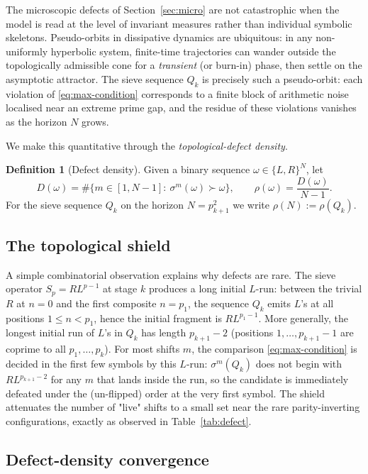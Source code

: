 \documentclass{iopjournal}
\theoremstyle{definition}
\newtheorem{definition}{Definition}
\begin{document}
The microscopic defects of Section~\ref{sec:micro} are not catastrophic
when the model is read at the level of invariant measures rather than
individual symbolic skeletons. Pseudo-orbits in dissipative dynamics are
ubiquitous: in any non-uniformly hyperbolic system, finite-time
trajectories can wander outside the topologically admissible cone for a
\emph{transient} (or burn-in) phase, then settle on the asymptotic
attractor. The sieve sequence $Q_k$ is precisely such a pseudo-orbit:
each violation of \eqref{eq:max-condition} corresponds to a finite block
of arithmetic noise localised near an extreme prime gap, and the residue
of these violations vanishes as the horizon $N$ grows.

We make this quantitative through the \emph{topological-defect density}.

\begin{definition}[Defect density]
Given a binary sequence $\omega \in \{L, R\}^N$, let
\[
    D(\omega) = \#\{m \in [1, N - 1] :\ \sigma^m(\omega) \succ \omega \},
\qquad
    \rho(\omega) = \frac{D(\omega)}{N - 1}.
\]
For the sieve sequence $Q_k$ on the horizon $N = p_{k+1}^2$ we write
$\rho(N) := \rho(Q_k)$.
\end{definition}

\subsection{The topological shield}

A simple combinatorial observation explains why defects are rare. The
sieve operator $S_p = R L^{p-1}$ at stage $k$ produces a long initial
$L$-run: between the trivial $R$ at $n = 0$ and the first composite
$n = p_1$, the sequence $Q_k$ emits $L$'s at all positions
$1 \leq n < p_1$, hence the initial fragment is $R L^{p_1 - 1}$. More
generally, the longest initial run of $L$'s in $Q_k$ has length
$p_{k+1} - 2$ (positions $1, \ldots, p_{k+1} - 1$ are coprime to all
$p_1, \ldots, p_k$). For most shifts $m$, the comparison
\eqref{eq:max-condition} is decided in the first few symbols by this
$L$-run: $\sigma^m(Q_k)$ does not begin with $R L^{p_{k+1} - 2}$ for any
$m$ that lands inside the run, so the candidate is immediately defeated
under the (un-flipped) order at the very first symbol. The shield
attenuates the number of "live" shifts to a small set near the rare
parity-inverting configurations, exactly as observed in
Table~\ref{tab:defect}.

\subsection{Defect-density convergence}
\end{document}
